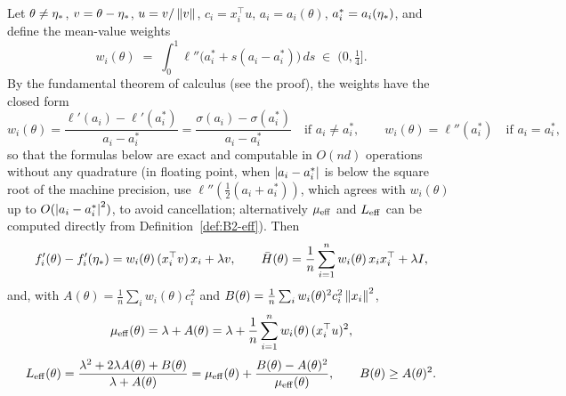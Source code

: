\begin{lemma}\label{lem:B2-logistic-formulas}
Let $\theta\neq\eta_\ast$, $v=\theta-\eta_\ast$, $u=v/\left\|v\right\|$, $c_i=x_i^\top u$, $a_i=a_i(\theta)$,
$a_i^\ast=a_i(\eta_\ast)$, and define the mean-value weights
\begin{equation}\label{eq:B2-weights}
w_i(\theta)\;=\;\int_0^1\ell''\big(a_i^\ast+s(a_i-a_i^\ast)\big)\,ds\;\in\;(0,\tfrac14] .
\end{equation}
By the fundamental theorem of calculus (see the proof), the weights have the closed form
\begin{equation}\label{eq:B2-weights-closed}
w_i(\theta)=\frac{\ell'(a_i)-\ell'(a_i^\ast)}{a_i-a_i^\ast}=\frac{\sigma(a_i)-\sigma(a_i^\ast)}{a_i-a_i^\ast}\quad\text{if }a_i\neq a_i^\ast,
\qquad w_i(\theta)=\ell''(a_i^\ast)\quad\text{if }a_i=a_i^\ast,
\end{equation}
so that the formulas below are exact and computable in $O(nd)$ operations without any quadrature (in floating point,
when $\left|a_i-a_i^\ast\right|$ is below the square root of the machine precision, use $\ell''(\frac12(a_i+a_i^\ast))$, which
agrees with $w_i(\theta)$ up to $O(\left|a_i-a_i^\ast\right|^2)$, to avoid cancellation; alternatively $\mu_{\mathrm{eff}}$ and $L_{\mathrm{eff}}$ can be
computed directly from Definition~\ref{def:B2-eff}). Then
\begin{equation}\label{eq:B2-logistic-graddiff}
f'_i(\theta)-f'_i(\eta_\ast)=w_i(\theta)\,(x_i^\top v)\,x_i+\lambda v,\qquad
\bar H(\theta)=\frac1n\sum_{i=1}^nw_i(\theta)\,x_ix_i^\top+\lambda I ,
\end{equation}
and, with $A(\theta)=\frac1n\sum_iw_i(\theta)c_i^2$ and $B(\theta)=\frac1n\sum_iw_i(\theta)^2c_i^2\left\|x_i\right\|^2$,
\begin{equation}\label{eq:B2-logistic-mueff}
\mu_{\mathrm{eff}}(\theta)=\lambda+A(\theta)=\lambda+\frac1n\sum_{i=1}^nw_i(\theta)\,(x_i^\top u)^2 ,
\end{equation}
\begin{equation}\label{eq:B2-logistic-Leff}
L_{\mathrm{eff}}(\theta)=\frac{\lambda^2+2\lambda A(\theta)+B(\theta)}{\lambda+A(\theta)}
=\mu_{\mathrm{eff}}(\theta)+\frac{B(\theta)-A(\theta)^2}{\mu_{\mathrm{eff}}(\theta)},\qquad B(\theta)\ge A(\theta)^2 .
\end{equation}
\end{lemma}

